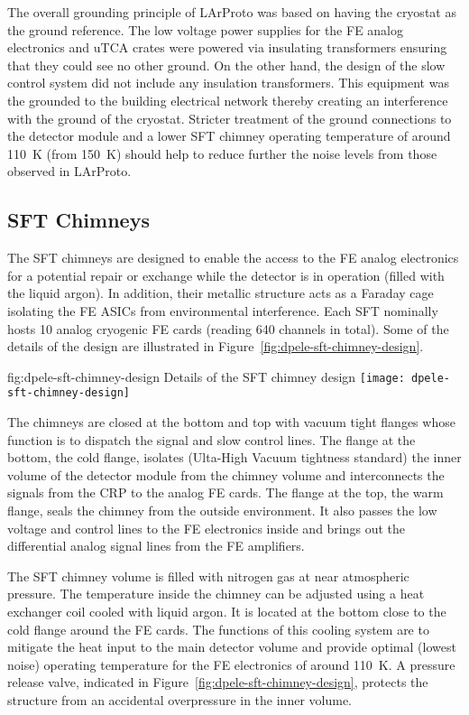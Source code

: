 The overall grounding principle of LArProto was based on having the cryostat as the ground reference. The low voltage power supplies for the FE analog electronics and uTCA crates were powered via insulating transformers ensuring that they could see no other ground. On the other hand, the design of the slow control system did not include any insulation transformers. This equipment was the grounded to the building electrical network thereby creating an interference with the ground of the cryostat. Stricter treatment of the ground connections to the detector module  and a lower SFT chimney operating temperature of around \SI{110}{\kelvin} (from \SI{150}{\kelvin}) should help to reduce further the noise levels from those observed in LArProto.


\subsection{SFT Chimneys}
\label{sec:fddp-tpc-elec-design-sft}

The SFT chimneys are designed to enable the access to the FE analog electronics for a potential repair or exchange while the detector is in operation (filled with the liquid argon). In addition, their metallic structure acts as a Faraday cage isolating the FE ASICs from environmental interference.  Each SFT nominally hosts \num{10} analog cryogenic FE cards (reading \num{640} channels in total).  Some of the details of the design are illustrated in Figure~\ref{fig:dpele-sft-chimney-design}. 

\begin{dunefigure}{fig:dpele-sft-chimney-design}
{Details of the SFT chimney design}
\texttt{[image: dpele-sft-chimney-design]}
\end{dunefigure}

The chimneys are closed at the bottom and top with vacuum tight flanges whose function is to dispatch the signal and slow control lines. The flange at the bottom, the cold flange, isolates (Ulta-High Vacuum tightness standard) the inner volume of the detector module from the chimney volume and interconnects the signals from the CRP to the analog FE cards. The flange at the top, the warm flange, seals the chimney from the outside environment. It also passes the low voltage and control lines to the FE electronics inside and brings out the differential analog signal lines from the FE amplifiers. 

The SFT chimney volume is filled with nitrogen gas at near atmospheric pressure. The temperature inside the chimney can be adjusted using a heat exchanger coil cooled with liquid argon. It is located at the bottom close to the cold flange around the FE cards. The functions of this cooling system are to mitigate the heat input to the main detector volume and provide optimal (lowest noise) operating temperature for the FE electronics of around \SI{110}{K}. A pressure release valve, indicated in Figure~\ref{fig:dpele-sft-chimney-design}, protects the structure from an accidental overpressure in the inner volume. 

